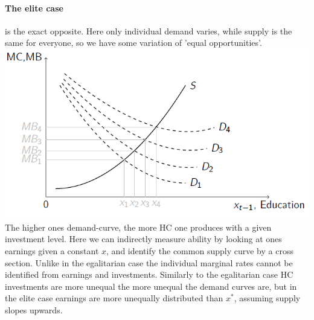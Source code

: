 \documentclass[12pt, a4paper]{article}
\begin{document}
\begin{multicols}{2}
\paragraph{The elite case} is the exact opposite. Here only individual demand varies, while supply is the same for everyone, so we have some variation of 'equal opportunities'. 
\includegraphics[width = 0.45 \textwidth]{elite.PNG}
The higher ones demand-curve, the more HC one produces with a given investment level. Here we can indirectly measure ability by looking at ones earnings given a constant $x$, and identify the common supply curve by a cross section. Unlike in the egalitarian case the individual marginal rates cannot be identified from earnings and investments. Similarly to the egalitarian case HC investments are more unequal the more unequal the demand curves are, but in the elite case earnings are more unequally distributed than $x^*$, assuming supply slopes upwards. 


\end{multicols}
\end{document}
